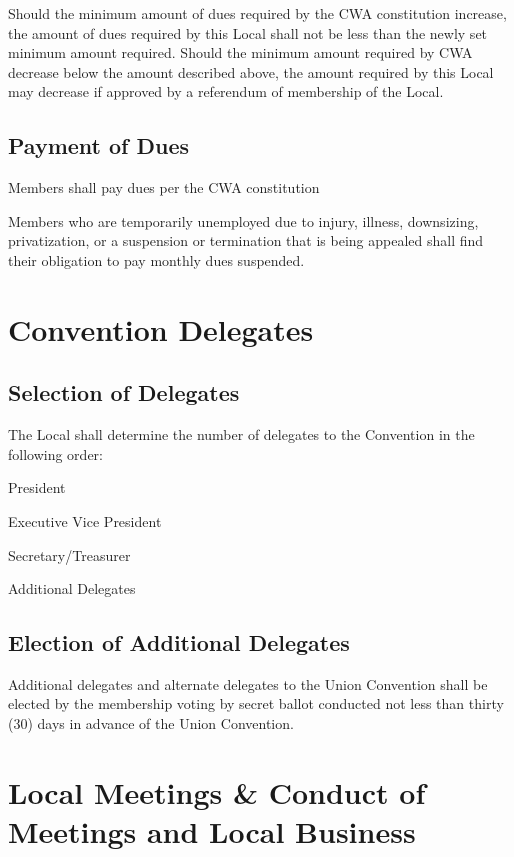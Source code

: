 \documentclass[11pt]{article}
\begin{document}
Should the minimum amount of dues required by the CWA constitution increase, the amount of dues required by this Local shall not be less than the newly set minimum amount required. Should the minimum amount required by CWA decrease below the amount described above, the amount required by this Local may decrease if approved by a referendum of membership of the Local.

\subsection{Payment of Dues}
\begin{paralist}
\item Members shall pay dues per the CWA constitution
\item Members who are temporarily unemployed due to injury, illness, downsizing, privatization, or a suspension or termination that is being appealed shall find their obligation to pay monthly dues suspended.
\end{paralist}

\section{Convention Delegates}
\subsection{Selection of Delegates}
The Local shall determine the number of delegates to the Convention in the following order:

\begin{numberlist}
\item President
\item Executive Vice President
\item Secretary/Treasurer
\item Additional Delegates
\end{numberlist}

\subsection{Election of Additional Delegates}
Additional delegates and alternate delegates to the Union Convention shall be elected by the membership voting by secret ballot conducted not less than thirty (30) days in advance of the Union Convention.

\section{Local Meetings \& Conduct of Meetings and Local Business}
\end{document}
